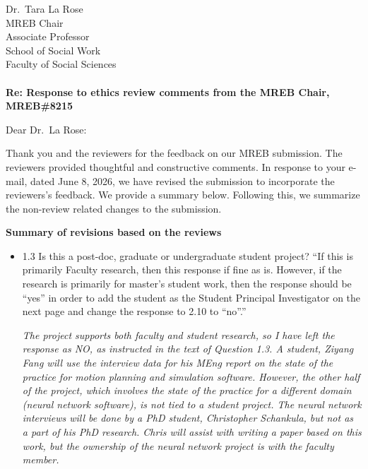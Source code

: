 \documentclass[12pt]{casletter}
\begin{document}
\begin{letter}{~\\
    ~\\
    ~\\
    ~\\
    ~\\
    Dr.\ Tara La Rose\\
    MREB Chair\\
    Associate Professor\\
    School of Social Work\\
    Faculty of Social Sciences\\
    ~\\
    {\bf Re: Response to ethics review comments from the MREB Chair, MREB\#8215}}

\opening {Dear Dr.\ La Rose:}

  Thank you and the reviewers for the feedback on our MREB submission.  The
  reviewers provided thoughtful and constructive comments.  In response to your
  e-mail, dated June 8, 2026, we have revised the submission to incorporate the
  reviewers's feedback.  We provide a summary below.  Following this, we summarize
  the non-review related changes to the submission.

\textbf{Summary of revisions based on the reviews}

\begin{itemize}
\item 1.3 Is this a post-doc, graduate or undergraduate student project? ``If
this is primarily Faculty research, then this response if fine as is. However,
if the research is primarily for master's student work, then the response should
be ``yes'' in order to add the student as the Student Principal Investigator on
the next page and change the response to 2.10 to ``no''.'' \medskip

\emph{The project supports both faculty and student research, so I have left the
response as NO, as instructed in the text of Question 1.3.  A student, Ziyang
Fang will use the interview data for his MEng report on the state of the
practice for motion planning and simulation software.  However, the other half
of the project, which involves the state of the practice for a different domain
(neural network software), is not tied to a student project.  The neural network
interviews will be done by a PhD student, Christopher Schankula, but not as a
part of his PhD research.  Chris will assist with writing a paper based on this
work, but the ownership of the neural network project is with the faculty
member.} \smallskip
  

\end{itemize}
\end{letter}
\end{document}
